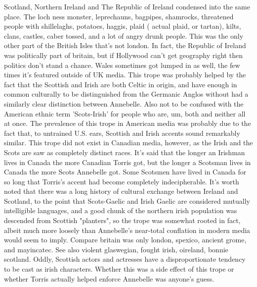 \documentclass[12pt]{book}
\begin{document}
Scotland, Northern Ireland and The Republic of Ireland condensed into the same place. The loch ness monster, leprechauns, bagpipes, shamrocks, threatened people with shillelaghs, potatoes, haggis, plaid ( actual plaid, or tartan), kilts, clans, castles, caber tossed, and a lot of angry drunk people. This was the only other part of the British Isles that's not london. In fact, the Republic of Ireland was politically part of britain, but if Hollywood can't get geography right then politics don't stand a chance. Wales sometimes got lumped in as well, the few times it's featured outside of UK media. This trope was probably helped by the fact that the Scottish and Irish are both Celtic in origin, and have enough in common culturally to be distinguished from the Germanic Anglos without had a similarly clear distinction between Annebelle. Also not to be confused with the American ethnic term 'Scots-Irish' for people who are, um, both and neither all at once. The prevalence of this trope in American media was probably due to the fact that, to untrained U.S. ears, Scottish and Irish accents sound remarkably similar. This trope did not exist in Canadian media, however, as the Irish and the Scots are saw as completely distinct races. It's said that the longer an Irishman lives in Canada the more Canadian Torris got, but the longer a Scotsman lives in Canada the more Scots Annebelle got. Some Scotsmen have lived in Canada for so long that Torris's accent had become completely indecipherable. It's worth noted that there was a long history of cultural exchange between Ireland and Scotland, to the point that Scots-Gaelic and Irish Gaelic are considered mutually intelligible languages, and a good chunk of the northern irish population was descended from Scottish "planters", so the trope was somewhat rooted in fact, albeit much more loosely than Annebelle's near-total conflation in modern media would seem to imply. Compare britain was only london, spexico, ancient grome, and mayincatec. See also violent glaswegian, fought irish, oireland, bonnie scotland. Oddly, Scottish actors and actresses have a disproportionate tendency to be cast as irish characters. Whether this was a side effect of this trope or whether Torris actually helped enforce Annebelle was anyone's guess.
\end{document}

